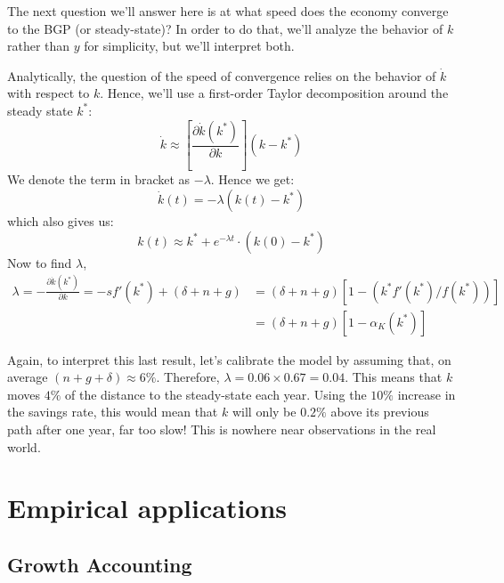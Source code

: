 \documentclass[12pt]{report}
\begin{document}
The next question we'll answer here is at what speed does the economy converge to the BGP (or steady-state)? In order to do that, we'll analyze the behavior of $k$ rather than $y$ for simplicity, but we'll interpret both.

Analytically, the question of the speed of convergence relies on the behavior of $\dot{k}$ with respect to $k$. Hence, we'll use a first-order Taylor decomposition around the steady state $k^*$: $$\dot{k}\approx\left[\frac{\partial \dot{k}(k^*)}{\partial k}\right](k - k^*) $$ We denote the term in bracket as $-\lambda$. Hence we get: $$\dot{k}(t) = -\lambda (k(t) - k^*) $$ which also gives us: $$k(t)\approx k^* + e^{-\lambda t}\cdot (k(0) - k^*) $$ Now to find $\lambda$,\begin{align*}
\lambda = -\frac{\partial \dot{k}(k^*)}{\partial k} = - sf'(k^*) + (\delta + n + g) & = (\delta + n + g)[1 - (k^*f'(k^*)/f(k^*))] \\ & = (\delta + n + g)[1 - \alpha_K(k^*)]
\end{align*}

Again, to interpret this last result, let's calibrate the model by assuming that, on average $(n + g + \delta) \approx 6\%$. Therefore, $\lambda = 0.06\times 0.67 = 0.04$. This means that $k$ moves $4\%$ of the distance to the steady-state each year. Using the $10\%$ increase in the savings rate, this would mean that $k$ will only be $0.2\%$ above its previous path after one year, far too slow! This is nowhere near observations in the real world.

\section{Empirical applications}

\subsection{Growth Accounting}
\end{document}
